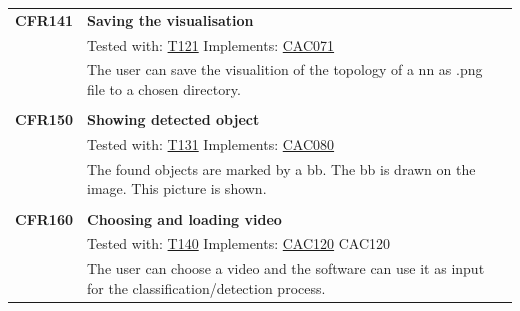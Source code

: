 \documentclass[parskip=full]{scrartcl}
\begin{document}
\begin{tabular}{p{2cm}p{11.4cm}}
\textbf{CFR141} \hypertarget{CFR121} & \textbf{Saving the visualisation}\\
& Tested with: \hyperlink{T121}{T121} Implements: \hyperlink{CAC071}{CAC071} \\
& The user can save the visualition of the topology of a \gls{nn} as .png file to a chosen directory.\\
& \\
\textbf {CFR150} \hypertarget{CFR131} & \textbf{Showing detected object} \\
& Tested with: \hyperlink{T131}{T131} Implements: \hyperlink{CAC080}{CAC080}\\
& The found objects are marked by a \gls{bb}. The \gls{bb} is drawn on the image. This picture is shown.\\
& \\
\textbf{CFR160} \hypertarget{CFR140} & \textbf{Choosing and loading video}\\
& Tested with: \hyperlink{T140}{T140} Implements: \hyperlink{CAC120}{CAC120} CAC120 \\
& The user can choose a video and the software can use it as input for the classification/detection process.\\
\end{tabular}
\newpage
\end{document}
